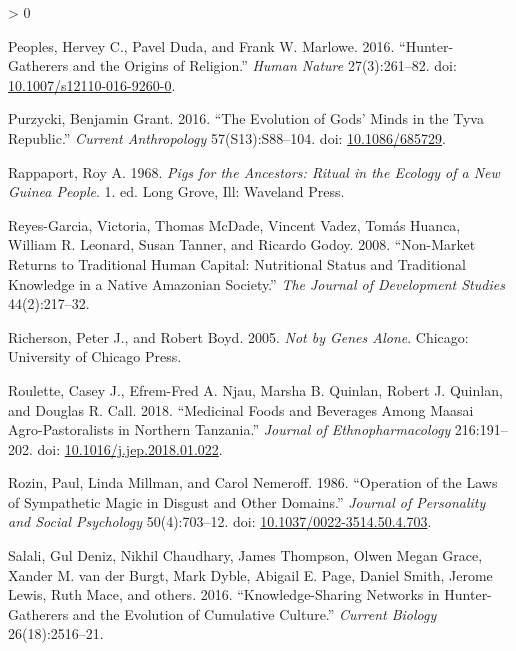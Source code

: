 \documentclass[
  11pt,
]{article}
\newlength{\cslhangindent}
\newenvironment{CSLReferences}[2] %
 {%
  \setlength{\parindent}{0pt}
  \ifodd #1 \everypar{\setlength{\hangindent}{\cslhangindent}}\ignorespaces\fi
  \ifnum #2 > 0
  \setlength{\parskip}{#2\baselineskip}
  \fi
 }%
 {}
\begin{document}
\begin{CSLReferences}{1}{0}
\leavevmode\hypertarget{ref-peoplesHunterGatherersOriginsReligion2016}{}%
Peoples, Hervey C., Pavel Duda, and Frank W. Marlowe. 2016. {``Hunter-{Gatherers} and the {Origins} of {Religion}.''} \emph{Human Nature} 27(3):261--82. doi: \href{https://doi.org/10.1007/s12110-016-9260-0}{10.1007/s12110-016-9260-0}.

\leavevmode\hypertarget{ref-purzyckiEvolutionGodsMinds2016}{}%
Purzycki, Benjamin Grant. 2016. {``The {Evolution} of {Gods}' {Minds} in the {Tyva Republic}.''} \emph{Current Anthropology} 57(S13):S88--104. doi: \href{https://doi.org/10.1086/685729}{10.1086/685729}.

\leavevmode\hypertarget{ref-rappaportPigsAncestorsRitual1968}{}%
Rappaport, Roy A. 1968. \emph{Pigs for the Ancestors: Ritual in the Ecology of a {New Guinea} People}. 1. ed. {Long Grove, Ill}: {Waveland Press}.

\leavevmode\hypertarget{ref-reyes2008non}{}%
Reyes-Garcia, Victoria, Thomas McDade, Vincent Vadez, Tomás Huanca, William R. Leonard, Susan Tanner, and Ricardo Godoy. 2008. {``Non-Market Returns to Traditional Human Capital: Nutritional Status and Traditional Knowledge in a Native Amazonian Society.''} \emph{The Journal of Development Studies} 44(2):217--32.

\leavevmode\hypertarget{ref-richersonNotGenesAlone2005}{}%
Richerson, Peter J., and Robert Boyd. 2005. \emph{Not by Genes Alone}. {Chicago: University of Chicago Press}.

\leavevmode\hypertarget{ref-rouletteMedicinalFoodsBeverages2018}{}%
Roulette, Casey J., Efrem-Fred A. Njau, Marsha B. Quinlan, Robert J. Quinlan, and Douglas R. Call. 2018. {``Medicinal Foods and Beverages Among {Maasai} Agro-Pastoralists in Northern {Tanzania}.''} \emph{Journal of Ethnopharmacology} 216:191--202. doi: \href{https://doi.org/10.1016/j.jep.2018.01.022}{10.1016/j.jep.2018.01.022}.

\leavevmode\hypertarget{ref-rozinOperationLawsSympathetic1986}{}%
Rozin, Paul, Linda Millman, and Carol Nemeroff. 1986. {``Operation of the Laws of Sympathetic Magic in Disgust and Other Domains.''} \emph{Journal of Personality and Social Psychology} 50(4):703--12. doi: \href{https://doi.org/10.1037/0022-3514.50.4.703}{10.1037/0022-3514.50.4.703}.

\leavevmode\hypertarget{ref-salali2016knowledge}{}%
Salali, Gul Deniz, Nikhil Chaudhary, James Thompson, Olwen Megan Grace, Xander M. van der Burgt, Mark Dyble, Abigail E. Page, Daniel Smith, Jerome Lewis, Ruth Mace, and others. 2016. {``Knowledge-Sharing Networks in Hunter-Gatherers and the Evolution of Cumulative Culture.''} \emph{Current Biology} 26(18):2516--21.


\end{CSLReferences}
\end{document}
